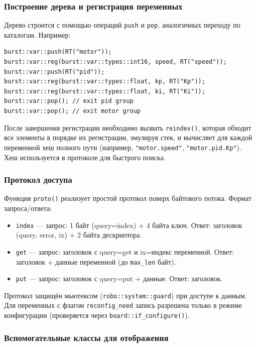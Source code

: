 \documentclass[a4paper,12pt]{article}
\begin{document}
\subsubsection{Построение дерева и регистрация переменных}

Дерево строится с помощью операций \texttt{push} и \texttt{pop}, аналогичных переходу по каталогам. Например:

\begin{lstlisting}[caption={Building a variable tree}]
burst::var::push(RT("motor"));
burst::var::reg(burst::var::types::int16, speed, RT("speed"));
burst::var::push(RT("pid"));
burst::var::reg(burst::var::types::float, kp, RT("Kp"));
burst::var::reg(burst::var::types::float, ki, RT("Ki"));
burst::var::pop(); // exit pid group
burst::var::pop(); // exit motor group
\end{lstlisting}

После завершения регистрации необходимо вызвать \texttt{reindex()}, которая обходит все элементы в порядке их регистрации, эмулируя стек, и вычисляет для каждой переменной хеш полного пути (например, \texttt{"motor.speed"}, \texttt{"motor.pid.Kp"}). Хеш используется в протоколе для быстрого поиска.

\subsubsection{Протокол доступа}

Функция \texttt{proto()} реализует простой протокол поверх байтового потока. Формат запроса/ответа:

\begin{itemize}
    \item \texttt{index} — запрос: 1 байт (query=index) + 4 байта ключ. Ответ: заголовок (query, error, ix) + 2 байта дескриптора.
    \item \texttt{get} — запрос: заголовок с query=get и ix=индекс переменной. Ответ: заголовок + данные переменной (до \texttt{max\_len} байт).
    \item \texttt{put} — запрос: заголовок с query=put + данные. Ответ: заголовок.
\end{itemize}

Протокол защищён мьютексом (\texttt{robo::system::guard}) при доступе к данным. Для переменных с флагом \texttt{reconfig\_need} запись разрешена только в режиме конфигурации (проверяется через \texttt{board::if\_configure()}).

\subsubsection{Вспомогательные классы для отображения}
\end{document}
